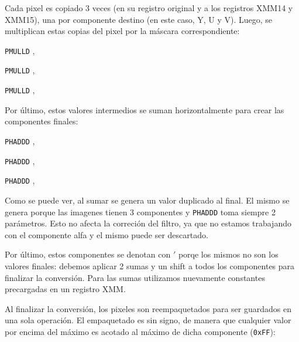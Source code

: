 Cada pixel es copiado 3 veces (en su registro original y a los registros XMM14 y XMM15), una por componente destino (en este caso, Y, U y V). Luego, se multiplican estas copias del pixel por la máscara correspondiente:

\begin{center}

	\texttt{PMULLD} ,  \hfill

	 

	\texttt{PMULLD} ,  \hfill

	 

	\texttt{PMULLD} ,  \hfill

	 
	
\end{center}

Por último, estos valores intermedios se suman horizontalmente para crear las componentes finales:

\begin{center}

	\texttt{PHADDD} ,  \hfill

	 

	\texttt{PHADDD} ,  \hfill

	 

	\texttt{PHADDD} ,  \hfill

	 

\end{center}

Como se puede ver, al sumar se genera un valor duplicado al final. El mismo se genera porque las imagenes tienen 3 componentes y \texttt{PHADDD} toma siempre 2 parámetros. Esto no afecta la correción del filtro, ya que no estamos trabajando con el componente alfa y el mismo puede ser descartado.

Por último, estos componentes se denotan con $'$ porqe los mismos no son los valores finales: debemos aplicar 2 sumas y un shift a todos los componentes para finalizar la conversión. Para las sumas utilizamos nuevamente constantes precargadas en un registro XMM.

Al finalizar la conversión, los pixeles son reempaquetados para ser guardados en una sola operación. El empaquetado es sin signo, de manera que cualquier valor por encima del máximo es acotado al máximo de dicha componente (\texttt{0xFF}):

